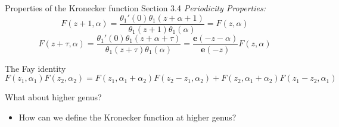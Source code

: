 \documentclass[11pt,aspectratio=169]{beamer}
\newcommand{\ee}[0]{\mathbf{e}}
\begin{document}
\begin{frame}{Properties of the Kronecker function}{\tiny \cite{BL13} Section 3.4}
    \emph{Periodicity Properties:}
    \[F(z+1,\alpha) = \frac{\theta_1'(0)\theta_1(z+\alpha+1)}{\theta_1(z+1)\theta_1(\alpha)} = F(z,\alpha)\]
    \[F(z+\tau,\alpha) = \frac{\theta_1'(0)\theta_1(z+\alpha+\tau)}{\theta_1(z+\tau)\theta_1(\alpha)} = \frac{\ee(-z-\alpha)}{\ee(-z)} F(z,\alpha)\]
    
    \pause{}

    \begin{block}{The Fay identity}
        \[F(z_1,\alpha_1)F(z_2,\alpha_2) = F(z_1,\alpha_1+\alpha_2)F(z_2-z_1,\alpha_2)+F(z_2,\alpha_1+\alpha_2)F(z_1-z_2,\alpha_1)\]
    \end{block}

    \pause{}

    {
        \begin{block}{What about higher genus?}
            \begin{itemize}
                \item How can we define the Kronecker function at higher genus?
            \end{itemize}
        \end{block}
    }
\end{frame}
\end{document}
